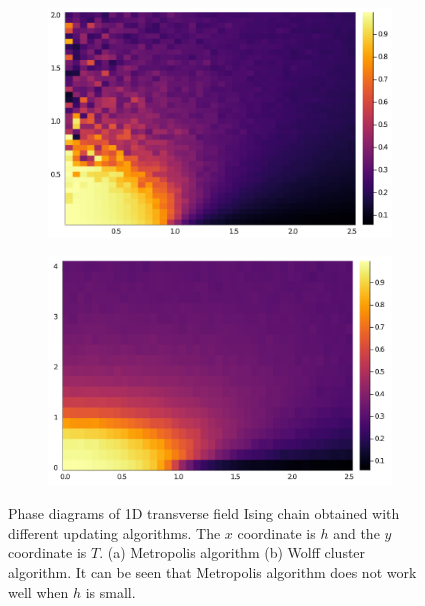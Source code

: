 \documentclass[hyperref, a4paper]{article}
\begin{document}
\begin{figure}
    \centering
    \begin{subfigure}{0.45\textwidth}
        \centering
        \includegraphics[width=\textwidth]{phase/phase-diagram-transverse-ising-metropolis.PNG}
        \subcaption{}
    \end{subfigure}
    \begin{subfigure}{0.45\textwidth}
        \centering
        \includegraphics[width=\textwidth]{phase/phase-diagram-transverse-ising-wolff.PNG}
        \subcaption{}
    \end{subfigure}
    \caption{Phase diagrams of 1D transverse field Ising chain obtained with different updating algorithms. The $x$ coordinate is $h$ and the $y$ coordinate is $T$. (a) Metropolis algorithm (b) Wolff cluster algorithm. 
    It can be seen that Metropolis algorithm does not work well when $h$ is small.}
    \label{fig:comparision-metropolis-wolff}
\end{figure}
\end{document}
